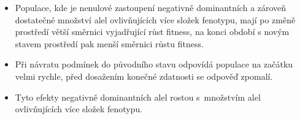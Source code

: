 \begin{enumerate}
{        \begin{itemize}
        \item{Populace, kde je nenulové zastoupení negativně dominantních a zároveň dostatečné množství alel ovlivňujících
              více složek fenotypu, mají po změně prostředí větší směrnici vyjadřující růst fitness,
              na konci období s novým stavem prostředí pak menší směrnici růstu fitness.}
        \item{Při návratu podmínek do původního stavu odpovídá populace na začátku velmi rychle, před dosažením konečné
              zdatnosti se odpověď zpomalí.}
        \item{Tyto efekty negativně dominantních alel rostou s množstvím alel ovlivňujících více složek fenotypu.}
        \end{itemize}
    }
\end{enumerate}